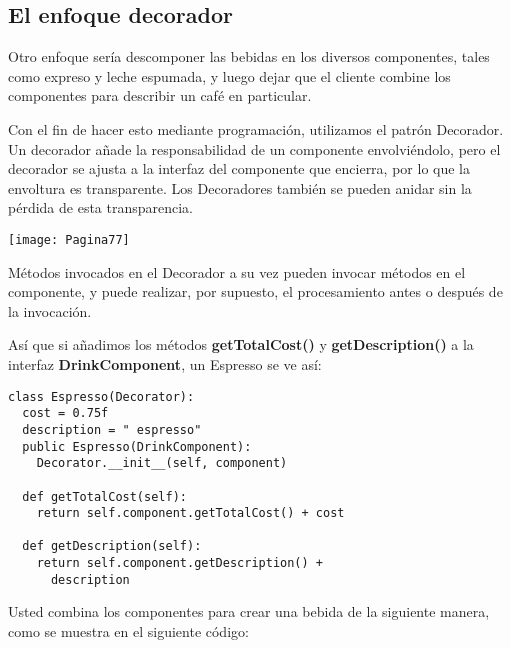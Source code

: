\subsection*{El enfoque decorador}
\label{subsec:eed}

Otro enfoque sería descomponer las bebidas en los diversos componentes, tales como expreso y leche espumada, y luego dejar que el cliente combine los componentes para describir un café en particular.    \newline

Con el fin de hacer esto mediante programación, utilizamos el patrón Decorador. Un decorador añade la responsabilidad de un componente envolviéndolo, pero el decorador se ajusta a la interfaz del componente que encierra, por lo que la envoltura es transparente. Los Decoradores también se pueden anidar sin la pérdida de esta transparencia. \newline

\texttt{[image: Pagina77]}

Métodos invocados en el Decorador a su vez pueden invocar métodos en el componente, y puede realizar, por supuesto, el procesamiento antes o después de la invocación.   \newline

Así que si añadimos los métodos \textbf{getTotalCost()} y \textbf{getDescription()} a la interfaz \textbf{DrinkComponent}, un Espresso se ve así:     \newline

\begin{lstlisting} 
class Espresso(Decorator): 
  cost = 0.75f 
  description = " espresso" 
  public Espresso(DrinkComponent): 
    Decorator.__init__(self, component) 
    
  def getTotalCost(self): 
    return self.component.getTotalCost() + cost 
    
  def getDescription(self): 
    return self.component.getDescription() + 
      description 
\end{lstlisting}

Usted combina los componentes para crear una bebida de la siguiente manera, como se muestra en el siguiente código:     \newline

